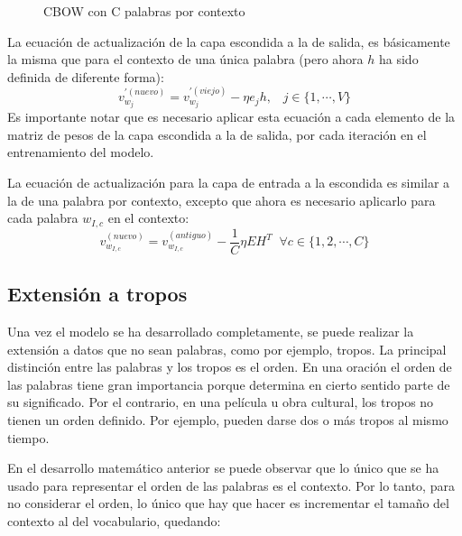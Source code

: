 \begin{figure}[ht]
  \caption{CBOW con C palabras por contexto}
  \label{redneuronal:4}
\end{figure}

La ecuación de actualización de la capa escondida a la de salida, es básicamente la misma que para el contexto de una
única palabra (pero ahora $h$ ha sido definida de diferente forma):
\begin{equation}
  v_{w_j}^{'(nuevo)}=v_{w_j}^{'(viejo)} - \eta e_j h, \;\;\; j \in \{1, \cdots, V\}
\end{equation}
Es importante notar que es necesario aplicar esta ecuación a cada elemento de la matriz de pesos de la capa escondida a la de salida,
por cada iteración en el entrenamiento del modelo.

La ecuación de actualización para la capa de entrada a la escondida es similar a la de una palabra por contexto, excepto que ahora es
necesario aplicarlo para cada palabra $w_{I,c}$ en el contexto:
\begin{equation}
  v_{w_{I,c}}^{(nuevo)} = v_{w_{I,c}}^{(antiguo)} - \frac{1}{C}\eta EH^T \;\; \forall c \in \{1,2,\cdots, C \}
\end{equation}

\subsection{Extensión a tropos}

Una vez el modelo se ha desarrollado completamente, se puede realizar la extensión a datos que no sean palabras, como por ejemplo, tropos. La principal distinción
entre las palabras y los tropos es el orden. En una oración el orden de las palabras tiene gran importancia porque determina en cierto sentido parte de su significado. Por
el contrario, en una película u obra cultural, los tropos no tienen un orden definido. Por ejemplo, pueden darse dos o más tropos al mismo tiempo.

En el desarrollo matemático anterior se puede observar que lo único que se ha usado para representar el orden de las palabras es el contexto. Por lo tanto, para no considerar el orden,
lo único que hay que hacer es incrementar el tamaño del contexto al del vocabulario, quedando:

